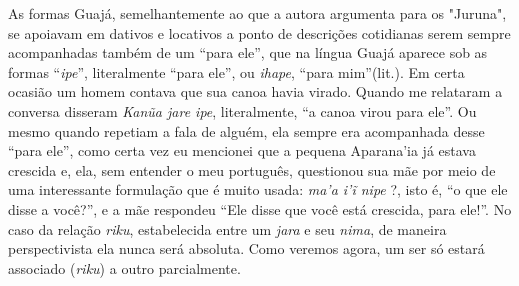As formas Guajá, semelhantemente ao que a autora argumenta para os
"Juruna", se apoiavam em dativos e locativos a ponto de descrições
cotidianas serem sempre acompanhadas também de um ``para ele'', que na
língua Guajá aparece sob as formas ``\emph{ipe}'', literalmente ``para
ele'', ou \emph{ihape}, ``para mim''(lit.). Em certa ocasião um homem
contava que sua canoa havia virado. Quando me relataram a conversa
disseram \emph{Kanũa jare ipe}, literalmente, ``a canoa virou para
ele''. Ou mesmo quando repetiam a fala de alguém, ela sempre era
acompanhada desse ``para ele'', como certa vez eu mencionei que a
pequena Aparana'ia já estava crescida e, ela, sem entender o meu
português, questionou sua mãe por meio de uma interessante formulação
que é muito usada: \emph{ma'a i'ĩ nipe} ?, isto é, ``o que ele disse a
você?'', e a mãe respondeu ``Ele disse que você está crescida, para
ele!''. No caso da relação \emph{riku}, estabelecida entre um
\emph{jara} e seu \emph{nima}, de maneira perspectivista ela nunca será
absoluta. Como veremos agora, um ser só estará associado (\emph{riku}) a
outro parcialmente.

